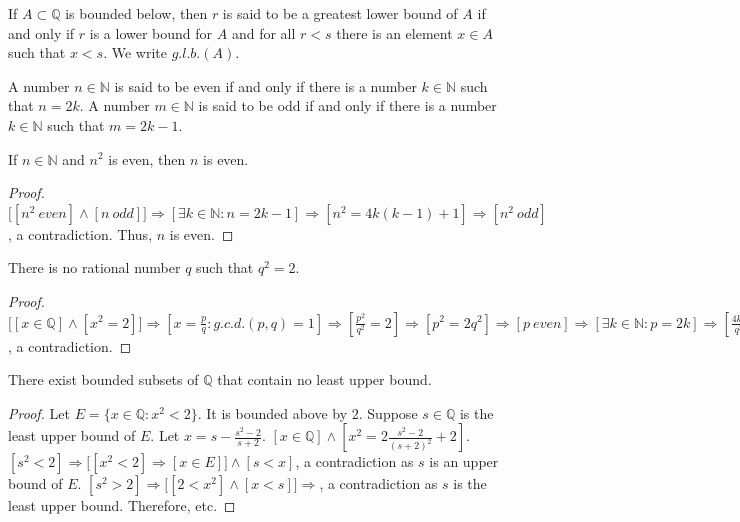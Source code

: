 \documentclass[crop=false,class=book,oneside]{standalone}
\begin{document}
            \begin{definition}
            If $A\subset \mathbb{Q}$ is bounded below, then $r$ is said to be a greatest lower bound of $A$ if and only if $r$ is a lower bound for $A$ and for all $r<s$ there is an element $x\in A$ such that $x<s$. We write $g.l.b.(A)$.
            \end{definition}
            \begin{definition}
            A number $n\in \mathbb{N}$ is said to be even if and only if there is a number $k\in \mathbb{N}$ such that $n=2k$. A number $m\in \mathbb{N}$ is said to be odd if and only if there is a number $k\in \mathbb{N}$ such that $m=2k-1$.
            \end{definition}
            \begin{lemma}
            If $n\in \mathbb{N}$ and $n^2$ is even, then $n$ is even.
            \end{lemma}
            \begin{proof}
            $\big[[n^2\ even]\land [n\ odd]\big]\Rightarrow [\exists k\in \mathbb{N}:n=2k-1]\Rightarrow [n^2 = 4k(k-1)+1]\Rightarrow [n^2\ odd]$, a contradiction. Thus, $n$ is even.
            \end{proof}
            \begin{theorem}
            There is no rational number $q$ such that $q^2 = 2$.
            \end{theorem}
            \begin{proof}
            $\big[[x\in \mathbb{Q}]\land [x^2=2]\big]\Rightarrow [x= \frac{p}{q}:g.c.d.(p,q)=1]\Rightarrow [\frac{p^2}{q^2}= 2]\Rightarrow [p^2 = 2q^2]\Rightarrow [p\ even]\Rightarrow [\exists k\in \mathbb{N}:p=2k]\Rightarrow [\frac{4k^2}{q^2}=2]\Rightarrow [q^2 = 2k^2]\Rightarrow [q\ even]\Rightarrow [g.c.d.(p,q)\geq 2]$, a contradiction.
            \end{proof}
            \begin{theorem}
            There exist bounded subsets of $\mathbb{Q}$ that contain no least upper bound.
            \end{theorem}
            \begin{proof}
            Let $E=\{x\in \mathbb{Q}:x^2 < 2\}$. It is bounded above by $2$. Suppose $s\in \mathbb{Q}$ is the least upper bound of $E$. Let $x = s - \frac{s^2-2}{s+2}$. $[x\in \mathbb{Q}] \land [x^2 = 2\frac{s^2-2}{(s+2)^2}+2]$. $[s^2<2]\Rightarrow \big[[x^2<2 ]\Rightarrow [x\in E]\big]\land [s<x]$, a contradiction as $s$ is an upper bound of $E$. $[s^2>2]\Rightarrow \big[[2<x^2 ]\land [x<s]\big]\Rightarrow$, a contradiction as $s$ is the least upper bound. Therefore, etc.
            \end{proof}
\end{document}
